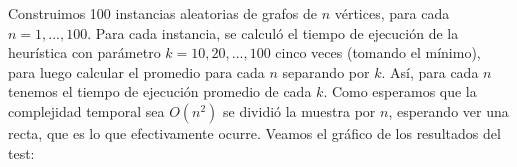 Construimos 100 instancias aleatorias de grafos de $n$ vértices, para cada $n = {1, ... , 100}$. Para cada instancia, se calculó el tiempo de ejecución de la heurística con parámetro $k = {10, 20, ..., 100}$ cinco veces (tomando el mínimo), para luego calcular el promedio para cada $n$ separando por $k$. Así, para cada $n$ tenemos el tiempo de ejecución promedio de cada $k$. Como esperamos que la complejidad temporal sea $O(n^2)$ se dividió la muestra por $n$, esperando ver una recta, que es lo que efectivamente ocurre. Veamos el gráfico de los resultados del test:

%

